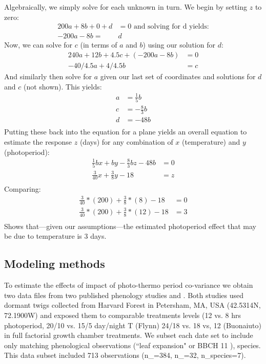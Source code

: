 \documentclass[11pt]{article}
\begin{document}
Algebraically, we simply solve for each unknown in turn. We begin by setting $z$ to zero:
\begin{align}
200a + 8b + 0 + d & = 0 \text{ and solving for d yields:} \\
-200a - 8b = & d  %
\end{align}
Now, we can solve for $c$ (in terms of $a$ and $b$) using our solution for $d$:
\begin{align}
240a+12b+4.5c+(-200a - 8b) &=0\\
-40/4.5a+4/4.5b & = c%
\end{align}
And similarly then solve for $a$ given our last set of coordinates and solutions for $d$ and $c$ (not shown). This yields:
\begin{align}
a & =\frac{1}{5}b\\
c & =-\frac{8}{3}b\\
d & =-48b\\
\end{align}
Putting these back into the equation for a plane yields an overall equation to estimate the response $z$ (days) for any combination of $x$ (temperature) and $y$ (photoperiod):
\begin{align}
\frac{1}{5}bx + by -\frac{8}{3}bz -48b&=0\\
\frac{3}{40}x + \frac{3}{8}y-18 & = z\\
\end{align}
Comparing:
\begin{align}
\frac{3}{40}*(200) + \frac{3}{8}*(8)-18 &=0\\ 
\frac{3}{40}*(200) + \frac{3}{8}*(12)-18 &=3\\ 
\end{align}
Shows that---given our assumptions---the estimated photoperiod effect that may be due to temperature is 3 days. 


\subsection*{Modeling methods}
To estimate the effects of impact of photo-thermo period co-variance we obtain two data files from two published phenology studies \cite{Flynn2018} and \cite{Buonaiuto:2021ug}. Both studies used dormant twigs collected from Harvard Forest in Petersham, MA, USA (42.5314\degree N, 72.1900\degree W)  and exposed them to comparable treatments levels (12 vs. 8 hrs photoperiod, 20/10 vs. 15/5 day/night T (Flynn) 24/18 vs. 18 vs, 12 (Buonaiuto) in full factorial growth chamber treatments. We subset each date set to include only matching phenological observations (``leaf expansion" or BBCH 11 \citep{Finn2007}), species. This data subset included 713 observations (n_{\cite{Flynn2018}}=384, n_{\cite{Buonaiuto:2021ug}}=32, n_{species}=7).
\end{document}
